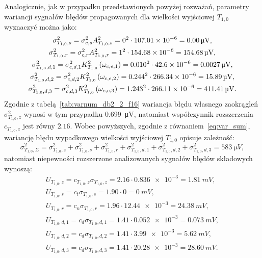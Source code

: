Analogicznie, jak w przypadku przedstawionych powyżej rozważań, parametry wariancji sygnałów błędów propagowanych dla wielkości wyjściowej $T_{1,0}$ wyznaczyć można jako:
\begin{gather}
\sigma_{T_{1,0},s}^{2} = \sigma_{c,s}^{2} A_{T_{1,0},s}^{2} = 0^{2} \cdot \num{107.01e-6} = \qty{0.00}{\micro V} \label{eq:sym_partd_output_var_stat_T_1_0}, \\
\sigma_{T_{1,0},r}^{2} = \sigma_{c,r}^{2} A_{T_{1,0},r}^{2} = 1^{2} \cdot \num{154.68e-6} = \qty{154.68}{\micro V} \label{eq:sym_partd_output_var_rand_T_1_0}, \\
\sigma_{T_{1,0},d,1}^{2} = \sigma_{c,d,1}^{2} K_{T_{1,0}}^{2} \left(\omega_{c,e,1}\right) = {0.010}^{2} \cdot \num{42.6e-6} = \qty{0.0027}{\micro V} \label{eq:sym_partd_output_var_dyn_1_T_1_0}, \\
\sigma_{T_{1,0},d,2}^{2} = \sigma_{c,d,2}^{2} K_{T_{1,0}}^{2}\left(\omega_{c,e,2}\right) = {0.244}^{2} \cdot \num{266.34e-6} = \qty{15.89}{\micro V} \label{eq:sym_partd_output_var_dyn_2_T_1_0}, \\
\sigma_{T_{1,0},d,3}^{2} = \sigma_{c,d,3}^{2} K_{T_{1,0}}^{2} \left(\omega_{c,e,3}\right) = {1.243}^{2} \cdot \num{266.11e-6} = \qty{411.41}{\micro V} \label{eq:sym_partd_output_var_dyn_3_T_1_0}.
\end{gather}
Zgodnie z tabelą~\ref{tab:varnum_db2_2_f16} wariancja błędu własnego zaokrągleń $\sigma_{T_{1,0},z}^{2}$ wynosi w tym przypadku \qty{0.699}{\micro V}, natomiast współczynnik rozszerzenia $c_{T_{1,0},z}$ jest równy $2.16$. Wobec powyższych, zgodnie z równaniem~\eqref{eq:var_sum}, wariancję błędu wypadkowego wielkości wyjściowej $T_{1,0}$ opisuje zależność:
\begin{equation}
\sigma_{T_{1,0},\Sigma}^{2} = \sigma_{T_{1,0},z}^{2} + \sigma_{T_{1,0},s}^{2} + \sigma_{T_{1,0},r}^{2} + \sigma_{T_{1,0},d,1}^{2} + \sigma_{T_{1,0},d,2}^{2} + \sigma_{T_{1,0},d,3}^{2} = \qty{583}{\micro V} \label{eq:sym_partd_output_var_sum_T_1_0},
\end{equation}
natomiast niepewności rozszerzone analizowanych sygnałów błędów składowych wynoszą:
\begin{gather}
U_{T_{1,0},z} = c_{T_{1,0},z} \sigma_{T_{1,0},z} = 2.16 \cdot \num{0.836e-3} = \qty{1.81}{mV} \label{eq:sym_partd_output_unc_roun_T_1_0},\\
U_{T_{1,0},s} = c_{t} \sigma_{T_{1,0},s} = 1.90 \cdot \num{0} = \qty{0}{mV} \label{eq:sym_partd_output_unc_stat_T_1_0}, \\
U_{T_{1,0},r} = c_{n} \sigma_{T_{1,0},r} = 1.96 \cdot \num{12.44e-3} = \qty{24.38}{mV} \label{eq:sym_partd_output_unc_rand_T_1_0}, \\
U_{T_{1,0},d,1} = c_{d} \sigma_{T_{1,0},d,1} = 1.41 \cdot \num{0.052e-3} = \qty{0.073}{mV} \label{eq:sym_partd_output_unc_dyn_1_T_1_0}, \\
U_{T_{1,0},d,2} = c_{d} \sigma_{T_{1,0},d,2} = 1.41 \cdot \num{3.99e-3} = \qty{5.62}{mV} \label{eq:sym_partd_output_unc_dyn_2_T_1_0}, \\
U_{T_{1,0},d,3} = c_{d} \sigma_{T_{1,0},d,3} = 1.41 \cdot \num{20.28e-3} = \qty{28.60}{mV} \label{eq:sym_partd_output_unc_dyn_3_T_1_0}.
\end{gather}

